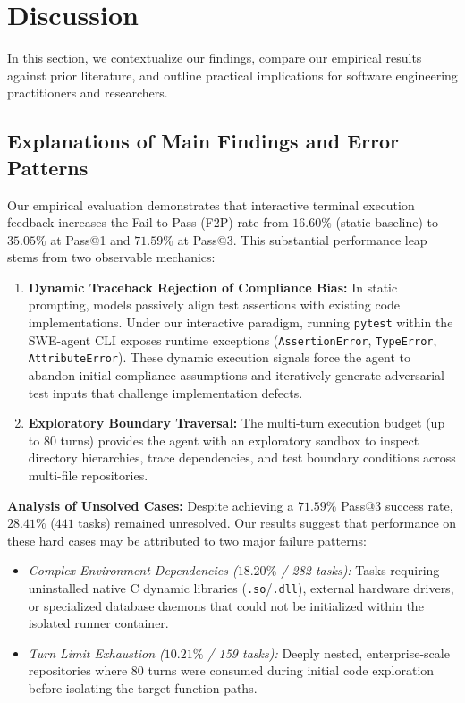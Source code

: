 \section{Discussion}
\label{sec:discussion}

In this section, we contextualize our findings, compare our empirical results against prior literature, and outline practical implications for software engineering practitioners and researchers.

\subsection{Explanations of Main Findings and Error Patterns}
Our empirical evaluation demonstrates that interactive terminal execution feedback increases the Fail-to-Pass (F2P) rate from $16.60\%$ (static baseline) to $35.05\%$ at Pass@1 and $71.59\%$ at Pass@3. This substantial performance leap stems from two observable mechanics:

\begin{enumerate}
    \item \textbf{Dynamic Traceback Rejection of Compliance Bias:} In static prompting, models passively align test assertions with existing code implementations. Under our interactive paradigm, running \texttt{pytest} within the SWE-agent CLI exposes runtime exceptions (\texttt{AssertionError}, \texttt{TypeError}, \texttt{AttributeError}). These dynamic execution signals force the agent to abandon initial compliance assumptions and iteratively generate adversarial test inputs that challenge implementation defects.
    \item \textbf{Exploratory Boundary Traversal:} The multi-turn execution budget (up to 80 turns) provides the agent with an exploratory sandbox to inspect directory hierarchies, trace dependencies, and test boundary conditions across multi-file repositories.
\end{enumerate}

\textbf{Analysis of Unsolved Cases:} Despite achieving a $71.59\%$ Pass@3 success rate, $28.41\%$ ($441$ tasks) remained unresolved. Our results suggest that performance on these hard cases may be attributed to two major failure patterns:
\begin{itemize}
    \item \textit{Complex Environment Dependencies ($18.20\%$ / 282 tasks):} Tasks requiring uninstalled native C dynamic libraries (\texttt{.so}/\texttt{.dll}), external hardware drivers, or specialized database daemons that could not be initialized within the isolated runner container.
    \item \textit{Turn Limit Exhaustion ($10.21\%$ / 159 tasks):} Deeply nested, enterprise-scale repositories where 80 turns were consumed during initial code exploration before isolating the target function paths.
\end{itemize}

